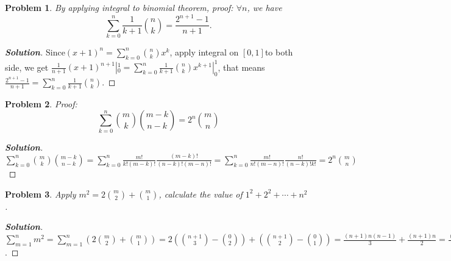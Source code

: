 \documentclass{ctexart}
\newtheorem{problem}{\textbf{Problem}}
\newenvironment{solution}{\begin{proof}[\textbf{Solution}]}{\end{proof}}
\renewcommand{\(}{\left(}
\renewcommand{\)}{\right)}
\newcommand{\Cb}[2]{\binom{#1}{#2}}
\begin{document}

\begin{problem}
By applying integral to binomial theorem, proof: 
$\forall n$,  we have
$$
\sum_{k=0}^{n}\frac{1}{k+1}\Cb{n}{k}=\frac{2^{n+1}-1}{n+1} .
$$
\end{problem}
\begin{solution}
Since$(x+1)^n=\sum_{k=0}^n\Cb{n}{k}x^k$, 
apply integral on $[0,1] $to both side, we get $\frac{1}{n+1}(x+1)^{n+1}|_0^1=\sum_{k=0}^n\frac{1}{k+1}\Cb{n}{k}x^{k+1}|_0^1$, 
that means $\frac{2^{n+1}-1}{n+1}=\sum_{k=0}^n\frac{1}{k+1}\Cb{n}{k}$.
\end{solution}

\begin{problem}
Proof:$$
\sum_{k=0}^n\Cb{m}{k}\Cb{m-k}{n-k}=2^n\Cb{m}{n}
$$
\end{problem}
\begin{solution}
$\sum_{k=0}^n\Cb{m}{k}\Cb{m-k}{n-k}=\sum_{k=0}^n\frac{m!}{k!(m-k)!}\frac{(m-k)!}{(n-k)!(m-n)!}=\sum_{k=0}^n\frac{m!}{n!(m-n)!}\frac{n!}{(n-k)!k!}=2^n\Cb{m}{n}$
\end{solution}

\begin{problem}
    Apply $m^2=2\Cb{m}{2}+\Cb{m}{1}$, calculate the value of  $1^2+2^2+\cdots+n^2$ .
\end{problem}
\begin{solution}
    $\sum_{m=1}^n m^2=\sum_{m=1}^n \(2\Cb{m}{2}+\Cb{m}{1}\)=2\(\Cb{n+1}{3}-\Cb{0}{2}\)+\(\Cb{n+1}{2}-\Cb{0}{1}\)=\frac{(n+1)n(n-1)}{3}+\frac{(n+1)n}{2}=\frac{(n+1)n(2n+1)}{6}$.
\end{solution}
\end{document}
